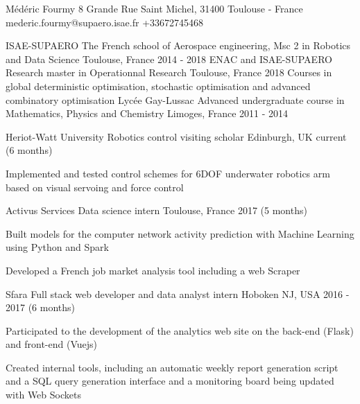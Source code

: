 \documentclass[11pt, a4paper, final]{resume}
\begin{document}
	\header
		{Médéric}
		{Fourmy}
		{8 Grande Rue Saint Michel, 31400 Toulouse - France}
		{mederic.fourmy@supaero.isae.fr}
		{+33672745468}
		{}{}

	\begin{cventries}
		\cventry
		{ISAE-SUPAERO}
		{The French school of Aerospace engineering, Msc 2 in Robotics and Data Science}
		{Toulouse, France}
		{2014 - 2018}
		{}
		\cventry
		{ENAC and ISAE-SUPAERO}
		{Research master in Operationnal Research}
		{Toulouse, France}
		{2018}
		{Courses in global deterministic optimisation, stochastic optimisation and advanced combinatory optimisation}
		\cventry
		{Lycée Gay-Lussac}
		{Advanced undergraduate course in Mathematics, Physics and Chemistry}
		{Limoges, France}
		{2011 - 2014}
		{}
	\end{cventries}

	\cvsection{Work experience}
	\begin{cventries}
		\cventry
		{Heriot-Watt University}
		{Robotics control visiting scholar}
		{Edinburgh, UK}
		{current (6 months)}
		{
			\begin{cvitems}{}
				\item Implemented and tested control schemes for 6DOF underwater robotics arm based on visual servoing and force control
			\end{cvitems}
		}
		\cventry
		{Activus Services}
		{Data science intern}
		{Toulouse, France}
		{2017 (5 months)}
		{
			\begin{cvitems}{}
				\item Built models for the computer network activity prediction with Machine Learning using Python and Spark
				\item Developed a French job market analysis tool including a web Scraper
			\end{cvitems}
		}
		\cventry
		{Sfara}
		{Full stack web developer and data analyst intern}
		{Hoboken NJ, USA}
		{2016 - 2017 (6 months)}
		{
			\begin{cvitems}{}
				\item Participated to the development of the analytics web site on the back-end (Flask) and front-end (Vuejs)
				\item Created internal tools, including an automatic weekly report generation script and a SQL query generation interface and a monitoring board being updated with Web Sockets
			\end{cvitems}
		}
	\end{cventries}
\end{document}
